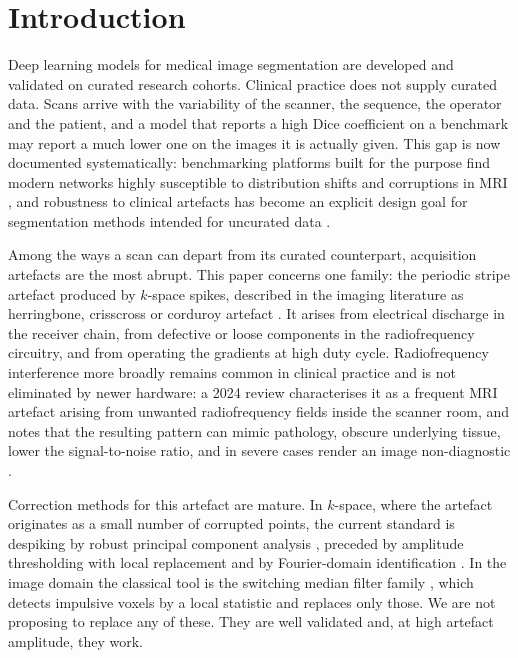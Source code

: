 \documentclass[12pt]{article}
\theoremstyle{definition}
\theoremstyle{plain}
\begin{document}
\section{Introduction}

Deep learning models for medical image segmentation are developed and validated on
curated research cohorts. Clinical practice does not supply curated data. Scans
arrive with the variability of the scanner, the sequence, the operator and the
patient, and a model that reports a high Dice coefficient on a benchmark may report
a much lower one on the images it is actually given. This gap is now documented
systematically: benchmarking platforms built for the purpose find modern networks
highly susceptible to distribution shifts and corruptions in MRI
\cite{boone2023rood}, and robustness to clinical artefacts has become an explicit
design goal for segmentation methods intended for uncurated data
\cite{billot2023synthseg}.

Among the ways a scan can depart from its curated counterpart, acquisition artefacts
are the most abrupt. This paper concerns one family: the periodic stripe artefact produced by $k$-space
spikes, described in the imaging literature as herringbone, crisscross or corduroy
artefact \cite{rios2026}. It arises from electrical discharge in the receiver chain,
from defective or loose components in the radiofrequency circuitry, and from
operating the gradients at high duty cycle. Radiofrequency interference more broadly
remains common in clinical practice and is not eliminated by newer hardware: a 2024
review characterises it as a frequent MRI artefact arising from unwanted
radiofrequency fields inside the scanner room, and notes that the resulting pattern
can mimic pathology, obscure underlying tissue, lower the signal-to-noise ratio, and
in severe cases render an image non-diagnostic \cite{kwok2024}.

Correction methods for this artefact are mature. In $k$-space, where the artefact
originates as a small number of corrupted points, the current standard is despiking
by robust principal component analysis \cite{campbell2016}, preceded by amplitude
thresholding with local replacement \cite{foo1994snore} and by Fourier-domain
identification \cite{kao2000}. In the image domain the classical tool is the
switching median filter family \cite{sun1994,hwang1995,wang1999}, which detects
impulsive voxels by a local statistic and replaces only those. We are not proposing
to replace any of these. They are well validated and, at high artefact amplitude,
they work.
\end{document}
